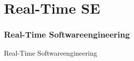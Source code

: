 
\section{Real-Time SE}
\begin{frame}[fragile]
	\frametitle{Real-Time Softwareengineering}
\huge Real-Time Softwareengineering
\end{frame}
